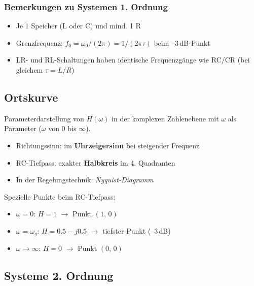 \documentclass[a4paper,12pt]{article}
\begin{document}
	
	\subsubsection*{Bemerkungen zu Systemen 1. Ordnung}
	\begin{itemize}
		\item Je 1 Speicher (L oder C) und mind. 1 R
		\item Grenzfrequenz: $f_0 = \omega_0/(2\pi) = 1/(2\pi\tau)$ beim --3\,dB-Punkt
		\item LR- und RL-Schaltungen haben identische Frequenzgänge wie RC/CR
		(bei gleichem $\tau = L/R$)
	\end{itemize}
	
	\subsection{Ortskurve}
	
	Parameterdarstellung von $H(\omega)$ in der komplexen Zahlenebene mit $\omega$
	als Parameter ($\omega$ von 0 bis $\infty$).
	\begin{itemize}
		\item Richtungssinn: im \textbf{Uhrzeigersinn} bei steigender Frequenz
		\item RC-Tiefpass: exakter \textbf{Halbkreis} im 4. Quadranten
		\item In der Regelungstechnik: \textit{Nyquist-Diagramm}
	\end{itemize}
	
	
	Spezielle Punkte beim RC-Tiefpass:
	\begin{itemize}
		\item $\omega = 0$: $H = 1$ $\rightarrow$ Punkt $(1,\, 0)$
		\item $\omega = \omega_g$: $H = 0.5 - j0.5$ $\rightarrow$ tiefster Punkt (--3\,dB)
		\item $\omega \to \infty$: $H = 0$ $\rightarrow$ Punkt $(0,\, 0)$
	\end{itemize}
	
	\subsection{Systeme 2. Ordnung}
	
\end{document}
